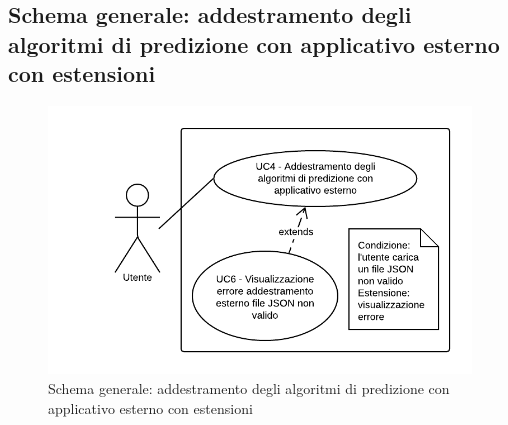 \subsection{Schema generale: addestramento degli algoritmi di predizione con applicativo esterno con estensioni}
\begin{figure}[H]
\includegraphics{img/UC4 - Schema generale.png}
\caption{Schema generale: addestramento degli algoritmi di predizione con applicativo esterno con estensioni}
\end{figure}
